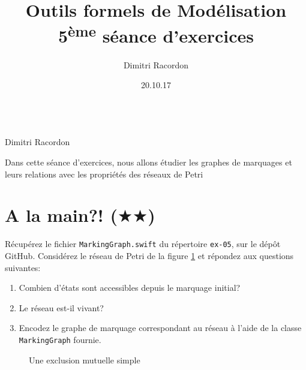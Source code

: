 \documentclass[a4paper, titlepage]{article}
\makeatletter
\numberwithin{figure}{section}
\numberwithin{table}{section}
\newcommand\objective[1]{\def\@objective{#1}}
\newcommand{\makecustomtitle}{%
	\begin{center}
		\huge\@title \\
		[1ex]\small Dimitri Racordon \\ \@date
	\end{center}
	\@objective
}
\makeatother
\begin{document}
  \title{Outils formels de Modélisation \\ 5\textsuperscript{ème} séance d'exercices}
  \author{Dimitri Racordon}
  \date{20.10.17}
	\objective{
    Dans cette séance d'exercices,
    nous allons étudier les graphes de marquages
    et leurs relations avec les propriétés des réseaux de Petri
  }

	\makecustomtitle

\section{A la main?! ($\bigstar\bigstar$)}

Récupérez le fichier \texttt{MarkingGraph.swift} du répertoire \texttt{ex-05}, sur le dépôt GitHub.
Considérez le réseau de Petri de la figure \ref{fig:mutex}
et répondez aux questions suivantes:

\begin{enumerate}
  \item Combien d'états sont accessibles depuis le marquage initial?
  \item Le réseau est-il vivant?
  \item Encodez le graphe de marquage correspondant au réseau
        à l'aide de la classe \texttt{MarkingGraph} fournie.
\end{enumerate}

\begin{figure}[ht]
  \centering
  \caption{Une exclusion mutuelle simple}
  \label{fig:mutex}
\end{figure}
\end{document}
